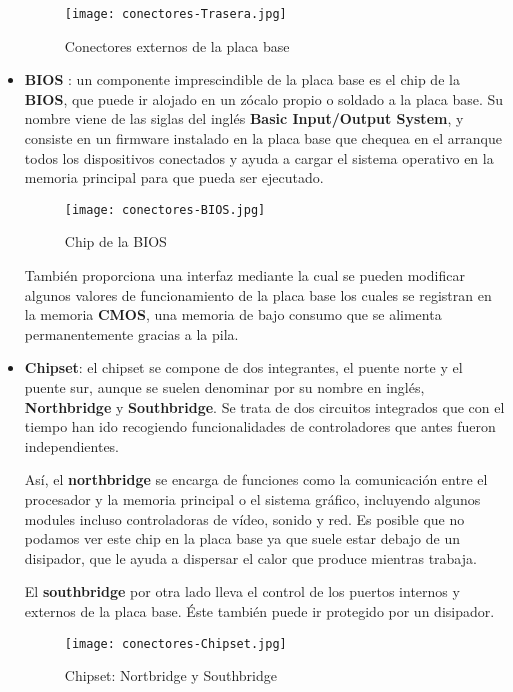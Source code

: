 \begin{itemize}
    \begin{figure}[H]
        \centering
        \texttt{[image: conectores-Trasera.jpg]}
        \caption{Conectores externos de la placa base}
    \end{figure}

    \item \textbf{BIOS }: un componente imprescindible de la placa base es el chip de la \textbf{BIOS}, que puede ir alojado en un zócalo propio o soldado a la placa base. Su nombre viene de las siglas del inglés \textbf{Basic Input/Output System}, y consiste en un firmware instalado en la placa base que chequea en el arranque todos los dispositivos conectados y ayuda a cargar el sistema operativo en la memoria principal para que pueda ser ejecutado.

    \begin{figure}[H]
        \centering
        \texttt{[image: conectores-BIOS.jpg]}
        \caption{Chip de la BIOS}
    \end{figure}

    También proporciona una interfaz mediante la cual se pueden modificar algunos valores de funcionamiento de la placa base los cuales se registran en la memoria \textbf{CMOS}, una memoria de bajo consumo que se alimenta permanentemente gracias a la pila.

    \item \textbf{Chipset}: el chipset se compone de dos integrantes, el puente norte y el puente sur, aunque se suelen denominar por su nombre en inglés, \textbf{Northbridge} y \textbf{Southbridge}. Se trata de dos circuitos integrados que con el tiempo han ido recogiendo funcionalidades de controladores que antes fueron independientes.

    Así, el \textbf{northbridge} se encarga de funciones como la comunicación entre el procesador y la memoria principal o el sistema gráfico, incluyendo algunos modules incluso controladoras de vídeo, sonido y red. Es posible que no podamos ver este chip en la placa base ya que suele estar debajo de un disipador, que le ayuda a dispersar el calor que produce mientras trabaja.

    El \textbf{southbridge} por otra lado lleva el control de los puertos internos y externos de la placa base. Éste también puede ir protegido por un disipador.

    \begin{figure}[H]
        \centering
        \texttt{[image: conectores-Chipset.jpg]}
        \caption{Chipset: Nortbridge y Southbridge}
    \end{figure}
\end{itemize}


